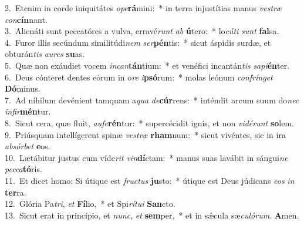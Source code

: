 {2.~}Etenim in corde iniquitátes \textit{o}\textit{pe}\textbf{rá}mini:~* in terra injustítias manus \textit{ve}\textit{stræ} \textit{con}\textbf{cín}nant.\\
{3.~}Alienáti sunt peccatóres a vulva, erravé\textit{runt} \textit{ab} \textbf{ú}tero:~* lo\textit{cú}\textit{ti} \textit{sunt} \textbf{fal}sa.\\
{4.~}Furor illis secúndum similitúdi\textit{nem} \textit{ser}\textbf{pén}tis:~* sicut áspidis surdæ, et obturán\textit{tis} \textit{au}\textit{res} \textbf{su}as.\\
{5.~}Quæ non exáudiet vocem \textit{in}\textit{can}\textbf{tán}tium:~* et venéfici incantán\textit{tis} \textit{sa}\textit{pi}\textbf{én}ter.\\
{6.~}Deus cónteret dentes eórum in o\textit{re} \textit{i}\textbf{psó}rum:~* molas leónum \textit{con}\textit{frín}\textit{get} \textbf{Dó}minus.\\
{7.~}Ad níhilum devénient tamquam a\textit{qua} \textit{de}\textbf{cúr}rens:~* inténdit arcum suum do\textit{nec} \textit{in}\textit{fir}\textbf{mén}tur.\\
{8.~}Sicut cera, quæ fluit, \textit{au}\textit{fe}\textbf{rén}tur:~* supercécidit ignis, et non \textit{vi}\textit{dé}\textit{runt} \textbf{so}lem.\\
{9.~}Priúsquam intellígerent spinæ \textit{ve}\textit{stræ} \textbf{rham}num:~* sicut vivéntes, sic in ira \textit{ab}\textit{sór}\textit{bet} \textbf{e}os.\\
{10.~}Lætábitur justus cum víde\textit{rit} \textit{vin}\textbf{dí}ctam:~* manus suas lavábit in sángui\textit{ne} \textit{pec}\textit{ca}\textbf{tó}ris.\\
{11.~}Et dicet homo: Si útique est \textit{fru}\textit{ctus} \textbf{ju}sto:~* útique est Deus júdicans \textit{e}\textit{os} \textit{in} \textbf{ter}ra.\\
{12.~}Glória Pa\textit{tri}, \textit{et} \textbf{Fí}lio,~* et Spi\textit{rí}\textit{tu}\textit{i} \textbf{San}cto.\\
{13.~}Sicut erat in princípio, et \textit{nunc}, \textit{et} \textbf{sem}per,~* et in sǽcula sæ\textit{cu}\textit{ló}\textit{rum}. \textbf{A}men.\\
